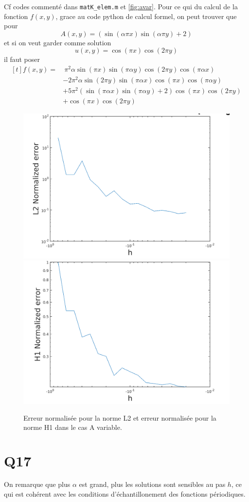 \documentclass[11pt]{article}
\begin{document}
Cf codes commenté dans \texttt{matK\_elem.m} et \autoref{fig:avar}. Pour ce qui du calcul de la fonction $f(x,y)$, grace au code python de calcul formel, on peut trouver que pour
\begin{equation}
  A(x,y)=(\sin(\alpha \pi x)\sin(\alpha \pi y) + 2)
\end{equation}
et si on veut garder comme solution
\begin{equation}
  u(x,y)=\cos(\pi x)\cos(2\pi y)
\end{equation}
il faut poser
\begin{equation}
  \begin{aligned}[t]
    f(x,y)=&~\pi^2\alpha\sin(\pi x)\sin(\pi\alpha y)\cos(2\pi y)\cos(\pi\alpha x)\\
    &- 2\pi^2\alpha\sin(2\pi y)\sin(\pi\alpha x)\cos(\pi x)\cos(\pi\alpha y) \\
    &+ 5\pi^2(\sin(\pi\alpha x)\sin(\pi\alpha y) + 2)\cos(\pi x)\cos(2\pi y) \\
    &+ \cos(\pi x)\cos(2\pi y)
  \end{aligned}
\end{equation}

\begin{figure}
  \centering
  \includegraphics[width=.6\textwidth]{L2_Avar} \\
  \includegraphics[width=.6\textwidth]{H1_Avar}
  \caption{Erreur normalisée pour la norme L2 et erreur normalisée pour la norme H1 dans le cas A variable.}
  \label{fig:avar}
\end{figure}

\section{Q17}

On remarque que plus $\alpha$ est grand, plus les solutions sont sensibles au pas $h$, ce qui est cohérent avec les conditions d'échantillonement des fonctions périodiques.
\end{document}
